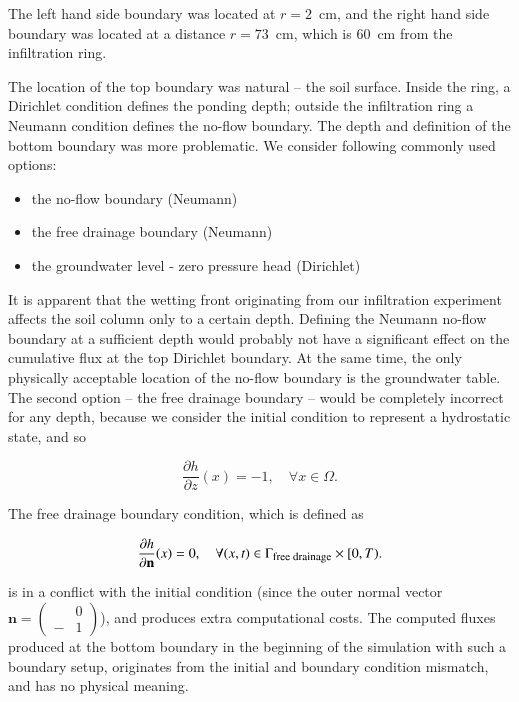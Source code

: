 \documentclass[review,times,3p,10pt]{elsarticle}
\newenvironment{lineq}
    {\begin{linenomath*}
    \begin{equation}
    }
    { 
    \end{equation} 
    \end{linenomath*}
    }
\renewcommand{\vec}{\mathbf}
\newcommand{\mich}[1]{{\color{blue}{#1}}}
\begin{document}
The left hand side boundary was located at $r=2$~cm, and the right hand side boundary was located at a distance $r=73$~cm, which is 60~cm from the infiltration ring. \mich{The reasons for such position of the left hand side boundary will be explained in the section below.}

 The location of the top boundary was natural -- the soil surface. Inside the ring, a Dirichlet condition defines the ponding depth; outside the infiltration ring a Neumann condition defines the no-flow boundary. The depth and definition of the bottom boundary was more problematic. We consider following commonly used options:
\begin{itemize}
\item the no-flow boundary (Neumann)
\item the free drainage boundary (Neumann)
\item the groundwater level - zero pressure head (Dirichlet)
\end{itemize}
It is apparent that the wetting front originating from our infiltration experiment affects the soil column only to a certain depth. Defining the Neumann no-flow boundary at a sufficient depth would probably not have a significant effect on the cumulative flux at the top Dirichlet boundary. At the same time, the only physically acceptable location of the no-flow boundary is the groundwater table. The second option -- the free drainage boundary -- would be completely incorrect for any depth, because we consider the initial condition to represent a hydrostatic state, and so \begin{lineq} \frac{\partial h}{\partial z}(x) = -1, \quad \forall x \in \Omega .\end{lineq} The free drainage boundary condition, which is defined as
\begin{lineq}
\frac{\partial h}{\partial \vec{n}}(x) = 0, \quad \forall (x,t) \in \Gamma_{\mbox{\footnotesize free drainage}} \times [0,T).
\end{lineq}
is in a conflict with the initial condition (since the outer normal vector $\vec{n} = \left(\begin{smallmatrix} &0 \\ -&1 \end{smallmatrix} \right)$), and produces extra computational costs. The computed fluxes produced at the bottom boundary in the beginning of the simulation with such a boundary setup, originates from the initial and boundary condition mismatch, and has no physical meaning.
\end{document}
